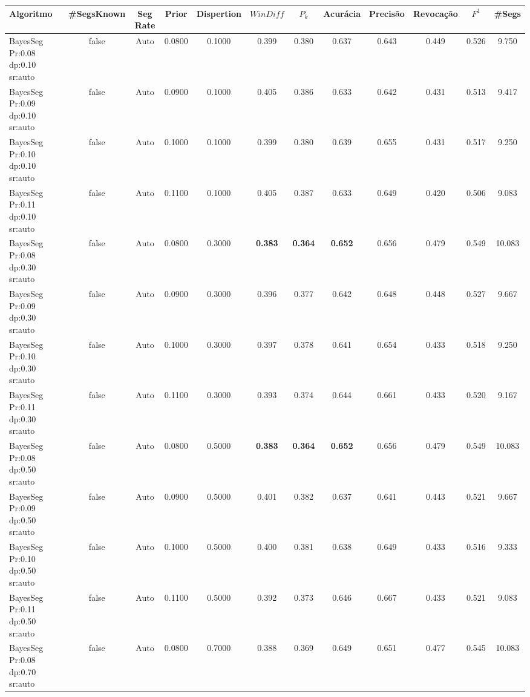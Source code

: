 \documentclass{article}
\begin{document}
\newpage
\begin{longtable}[c]{|l|c|c|c|c|c|c|c|c|c|c|c|} 
\hline 
Algoritmo & \#SegsKnown & Seg Rate & Prior & Dispertion & $WinDiff$ & $P_k$ & Acurácia & Precisão & Revocação & $F^1$ & \#Segs\\ \hline 
BayesSeg Pr:0.08 dp:0.10 sr:auto & false & Auto & 0.0800 & 0.1000 & 0.399 & 0.380 & 0.637 & 0.643 & 0.449 & 0.526 & 9.750  \\ \hline 
 BayesSeg Pr:0.09 dp:0.10 sr:auto & false & Auto & 0.0900 & 0.1000 & 0.405 & 0.386 & 0.633 & 0.642 & 0.431 & 0.513 & 9.417  \\ \hline 
 BayesSeg Pr:0.10 dp:0.10 sr:auto & false & Auto & 0.1000 & 0.1000 & 0.399 & 0.380 & 0.639 & 0.655 & 0.431 & 0.517 & 9.250  \\ \hline 
 BayesSeg Pr:0.11 dp:0.10 sr:auto & false & Auto & 0.1100 & 0.1000 & 0.405 & 0.387 & 0.633 & 0.649 & 0.420 & 0.506 & 9.083  \\ \hline 
 BayesSeg Pr:0.08 dp:0.30 sr:auto & false & Auto & 0.0800 & 0.3000 & \cellcolor{gray!20} \textbf{0.383} & \cellcolor{gray!20} \textbf{0.364} & \cellcolor{gray!20} \textbf{0.652} & 0.656 & 0.479 & 0.549 & 10.083  \\ \hline 
 BayesSeg Pr:0.09 dp:0.30 sr:auto & false & Auto & 0.0900 & 0.3000 & 0.396 & 0.377 & 0.642 & 0.648 & 0.448 & 0.527 & 9.667  \\ \hline 
 BayesSeg Pr:0.10 dp:0.30 sr:auto & false & Auto & 0.1000 & 0.3000 & 0.397 & 0.378 & 0.641 & 0.654 & 0.433 & 0.518 & 9.250  \\ \hline 
 BayesSeg Pr:0.11 dp:0.30 sr:auto & false & Auto & 0.1100 & 0.3000 & 0.393 & 0.374 & 0.644 & 0.661 & 0.433 & 0.520 & 9.167  \\ \hline 
 BayesSeg Pr:0.08 dp:0.50 sr:auto & false & Auto & 0.0800 & 0.5000 & \cellcolor{gray!20} \textbf{0.383} & \cellcolor{gray!20} \textbf{0.364} & \cellcolor{gray!20} \textbf{0.652} & 0.656 & 0.479 & 0.549 & 10.083  \\ \hline 
 BayesSeg Pr:0.09 dp:0.50 sr:auto & false & Auto & 0.0900 & 0.5000 & 0.401 & 0.382 & 0.637 & 0.641 & 0.443 & 0.521 & 9.667  \\ \hline 
 BayesSeg Pr:0.10 dp:0.50 sr:auto & false & Auto & 0.1000 & 0.5000 & 0.400 & 0.381 & 0.638 & 0.649 & 0.433 & 0.516 & 9.333  \\ \hline 
 BayesSeg Pr:0.11 dp:0.50 sr:auto & false & Auto & 0.1100 & 0.5000 & 0.392 & 0.373 & 0.646 & 0.667 & 0.433 & 0.521 & 9.083  \\ \hline 
 BayesSeg Pr:0.08 dp:0.70 sr:auto & false & Auto & 0.0800 & 0.7000 & 0.388 & 0.369 & 0.649 & 0.651 & 0.477 & 0.545 & 10.083  \\ \hline 

\end{longtable}
\end{document}
